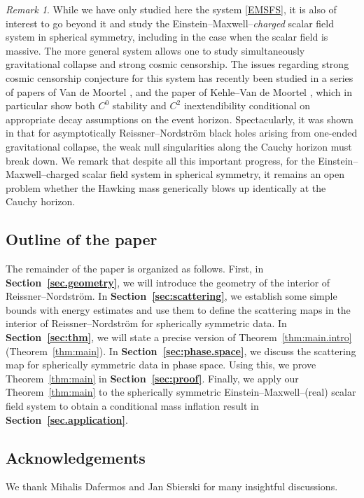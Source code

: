 \documentclass[10pt, reqno]{amsart}
\theoremstyle{definition}
\theoremstyle{remark}
\newtheorem{remark}[theorem]{Remark}
\numberwithin{equation}{section}
\newcommand{\0}{\emptyset}
\begin{document}
\begin{remark}
While we have only studied here the system \eqref{EMSFS}, it is also of interest to go beyond it and study the Einstein--Maxwell--\emph{charged} scalar field system in spherical symmetry, including in the case when the scalar field is massive. The more general system allows one to study simultaneously gravitational collapse and strong cosmic censorship. The issues regarding strong cosmic censorship conjecture for this system has recently been studied in a series of papers of Van de Moortel \cite{VDM,VDM2,VDM3,VDM4}, and the paper of Kehle--Van de Moortel \cite{KehleVdM}, which in particular show both $C^0$ stability and $C^2$ inextendibility conditional on appropriate decay assumptions on the event horizon. Spectacularly, it was shown in \cite{VDM3} that for asymptotically Reissner--Nordstr\"om black holes arising from one-ended gravitational collapse, the weak null singularities along the Cauchy horizon must break down. We remark that despite all this important progress, for the Einstein--Maxwell--charged scalar field system in spherical symmetry, it remains an open problem whether the Hawking mass generically blows up identically at the Cauchy horizon.
\end{remark}

\subsection{Outline of the paper} The remainder of the paper is organized as follows. First, in \textbf{Section~\ref{sec.geometry}}, we will introduce the geometry of the interior of Reissner--Nordstr\"om. In \textbf{Section~\ref{sec:scattering}}, we establish some simple bounds with energy estimates and use them to define the scattering maps in the interior of Reissner--Nordstr\"om for spherically symmetric data. In \textbf{Section~\ref{sec:thm}}, we will state a precise version of Theorem~\ref{thm:main.intro} (Theorem~\ref{thm:main}). In \textbf{Section~\ref{sec:phase.space}}, we discuss the scattering map for spherically symmetric data in phase space. Using this, we prove Theorem~\ref{thm:main} in \textbf{Section~\ref{sec:proof}}. Finally, we apply our Theorem~\ref{thm:main} to the spherically symmetric Einstein--Maxwell--(real) scalar field system to obtain a conditional mass inflation result in \textbf{Section~\ref{sec.application}}. 

\subsection*{Acknowledgements} We thank Mihalis Dafermos and Jan Sbierski for many insightful discussions.
\end{document}
